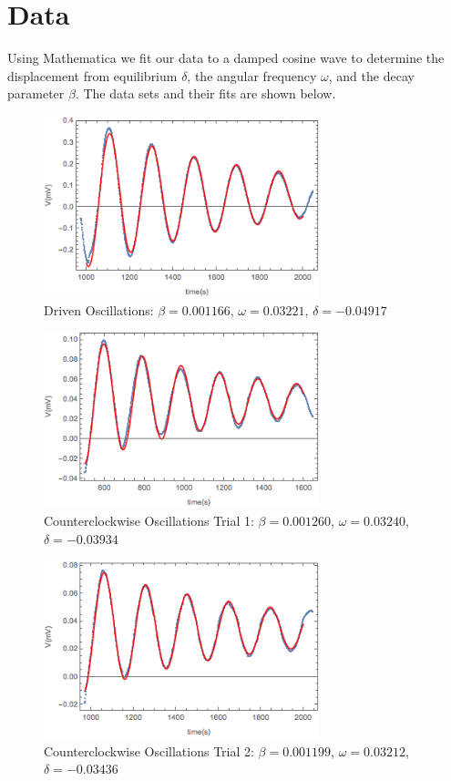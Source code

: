 \documentclass[aps, reprint,amsmath,amssymb]{revtex4-1} %
\begin{document}
\section{Data}

Using Mathematica we fit our data to a damped cosine wave to determine the displacement from equilibrium $\delta$, the angular frequency $\omega$, and the decay parameter $\beta$. The data sets and their fits are shown below.

\begin{figure}[h!]
\centering
\caption{Driven Oscillations: $\beta = 0.001166$, $\omega = 0.03221$, $\delta=-0.04917$}

\includegraphics[width=8cm]{figs/drivenplot.png}
\end{figure}

\begin{figure}[h!]
\centering
\caption{Counterclockwise Oscillations Trial 1: $\beta = 0.001260$, $\omega = 0.03240$, $\delta=-0.03934$}
\includegraphics[width=8cm]{figs/counterclockwise1plot.png}
\end{figure}

\begin{figure}[h!]
\centering
\caption{Counterclockwise Oscillations Trial 2: $\beta = 0.001199$, $\omega = 0.03212$, $\delta=-0.03436$}
\includegraphics[width=8cm]{figs/counterclockwise2plot.png}
\end{figure}
\end{document}
